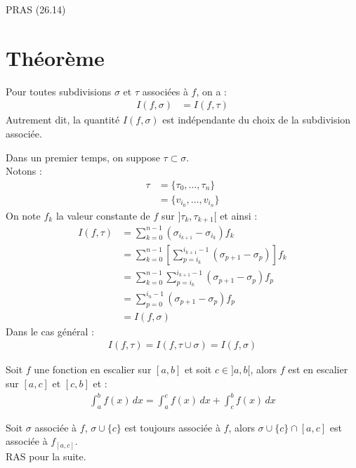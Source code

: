 \documentclass[../main.tex]{subfiles}
\begin{document}
\noindent PRAS (26.14)

\section{Théorème}
\begin{tcolorbox}[title=Théorème 26.17, title filled=false, colframe=orange, colback=orange!10!white]
    Pour toutes subdivisions $\sigma$ et $\tau$ associées à $f$, on a : 
    \begin{align*}
        I(f, \sigma) &= I(f, \tau)
    \end{align*}
    Autrement dit, la quantité $I(f, \sigma)$ est indépendante du choix de la subdivision associée. 
\end{tcolorbox}

\noindent Dans un premier temps, on suppose $\tau \subset \sigma$. \\
Notons : 
\begin{align*}
    \tau &= \{ \tau_0, \ldots, \tau_n \} \\
    &= \{ v_{i_0}, \ldots, v_{i_n} \}
\end{align*}
On note $f_k$ la valeur constante de $f$ sur $]\tau_k, \tau_{k+1}[$ et ainsi : 
\begin{align*}
    I(f, \tau) &= \sum_{k=0}^{n-1} (\sigma_{i_{k+1}} - \sigma_{i_k}) f_k \\
    &= \sum_{k=0}^{n-1} \left[ \sum_{p=i_k}^{i_{k+1} - 1} (\sigma_{p+1} - \sigma_p) \right] f_k \\
    &= \sum_{k=0}^{n-1} \sum_{p=i_k}^{i_{k+1} - 1} (\sigma_{p+1} - \sigma_p) f_p \\
    &= \sum_{p=0}^{i_n - 1} (\sigma_{p+1} - \sigma_p) f_p \\
    &= I(f, \sigma)
\end{align*}
Dans le cas général : 
\begin{align*}
    I(f, \tau) = I(f, \tau \cup \sigma) = I(f, \sigma)
\end{align*}

\begin{tcolorbox}[title=Propostion 26.21, title filled=false, colframe=lightblue, colback=lightblue!10!white]
    Soit $f$ une fonction en escalier sur $[a,b]$ et soit $c\in ]a, b[$, alors $f$ est en escalier sur $[a,c]$ et $[c,b]$ et : 
    \begin{align*}
        \int_{a}^{b} f(x) \,dx = \int_{a}^{c} f(x) \,dx + \int_{c}^{b} f(x) \,dx
    \end{align*}
\end{tcolorbox}

\noindent Soit $\sigma$ associée à $f$, $\sigma \cup \{c\}$ est toujours associée à $f$, alors $\sigma \cup \{c\} \cap [a, c]$ est associée à $f_{[a,c]}$. \\
RAS pour la suite. 
\end{document}
